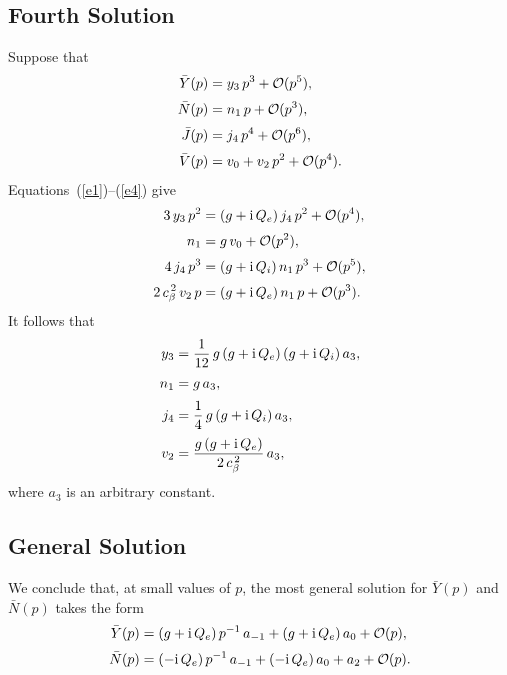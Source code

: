 \documentclass[12pt,prb,aps,notitlepage]{revtex4-1}
\begin{document}
\subsection{Fourth Solution}
Suppose that
\begin{align}
\bar{Y}(p) &= y_3\,p^3 +{ \cal O}(p^5),\\[0.5ex]
\bar{N}(p) &=n_1\,p + {\cal O}(p^3),\\[0.5ex]
\bar{J}(p) &= j_4\,p^4 + {\cal O}(p^6),\\[0.5ex]
\bar{V}(p) &= v_0 + v_2\,p^2 +{ \cal O}(p^4).
\end{align}
Equations~(\ref{e1})--(\ref{e4}) give 
\begin{align}
3\,y_3 \,p^2&= (g+{\rm i}\,Q_e)\,j_4\,p^2 + {\cal O}(p^4),\\[0.5ex]
n_1&= g\,v_0 +{\cal O}(p^2),\\[0.5ex]
4\,j_4\,p^3 &= (g+{\rm i}\,Q_i)\,n_1\,p^3 + {\cal O}(p^5),\\[0.5ex]
2\,c_\beta^{\,2}\,v_2\,p& = (g+{\rm i}\,Q_e)\,n_1\,p + {\cal O}(p^3).
\end{align}
It follows that 
\begin{align}
y_3& = \frac{1}{12}\,g\,(g+{\rm i}\,Q_e)\,(g+{\rm i}\,Q_i)\,a_3,\\[0.5ex]
n_1 &= g\,a_3,\\[0.5ex]
j_4 &= \frac{1}{4}\,g\,(g+{\rm i}\,Q_i)\,a_3,\\[0.5ex]
v_2 &= \frac{g\,(g+{\rm i}\,Q_e)}{2\,c_\beta^{\,2}}\,a_3,
\end{align}
where $a_3$ is an arbitrary constant. 

\subsection{General Solution}
We conclude that, at small values of $p$, the most general solution for $\bar{Y}(p)$ and $\bar{N}(p)$ takes the form 
\begin{align}\label{yy}
\bar{Y}(p) &= (g+{\rm i}\,Q_e)\,p^{-1}\,a_{-1} +(g+{\rm i}\,Q_e) \,a_0+ {\cal O}(p),\\[0.5ex]
\bar{N}(p) &= (-{\rm i}\,Q_e)\,p^{-1}\,a_{-1} + (-{\rm i}\,Q_e)\,a_0 + a_2 + {\cal O}(p).\label{nn}
\end{align}
\end{document}
